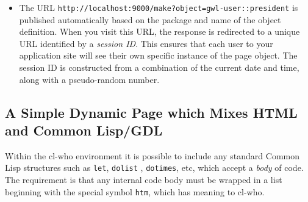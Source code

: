\documentclass [11pt]{book}
\begin{document}
\begin{itemize}
\item The URL \texttt{http://localhost:9000/make?object=gwl-user::president} is published automatically based on the package and
      name of the object definition. When you visit this URL, the
      response is redirected to a unique URL identified by
      a \emph{session ID}. This ensures that each user to your
      application site will see their own specific instance of the
      page object. The session ID is constructed from a combination of
      the current date and time, along with a pseudo-random
      number.

\end{itemize}





\subsection{A Simple Dynamic Page which Mixes HTML and Common Lisp/GDL}

\label{subsec:asimpledynamicpagewhichmixeshtmlandcommonlisp/gdl}



Within the cl-who environment it is possible to include any standard
Common Lisp structures such as \texttt{let}, \texttt{dolist} , \texttt{dotimes}, etc, which accept a \emph{body} of code. The requirement is that any internal code body
	  must be wrapped in a list beginning with the special symbol \texttt{htm}, which has meaning to cl-who. 
\end{document}
